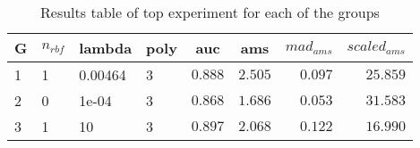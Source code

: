\begin{table}[!tbp]
\caption{Results table of top experiment for each of the groups\label{table:results}} 
\begin{center}
\begin{tabular}{llllrrrr}
\hline\hline
\multicolumn{1}{c}{G}&\multicolumn{1}{c}{$n_{rbf}$}&\multicolumn{1}{c}{lambda}&\multicolumn{1}{c}{poly}&\multicolumn{1}{c}{auc}&\multicolumn{1}{c}{ams}&\multicolumn{1}{c}{$mad_{ams}$}&\multicolumn{1}{c}{$scaled_{ams}$}\tabularnewline
\hline
1&1&0.00464&3&$0.888$&$2.505$&$0.097$&$25.859$\tabularnewline
2&0&1e-04&3&$0.868$&$1.686$&$0.053$&$31.583$\tabularnewline
3&1&10&3&$0.897$&$2.068$&$0.122$&$16.990$\tabularnewline
\hline
\end{tabular}\end{center}
\end{table}
